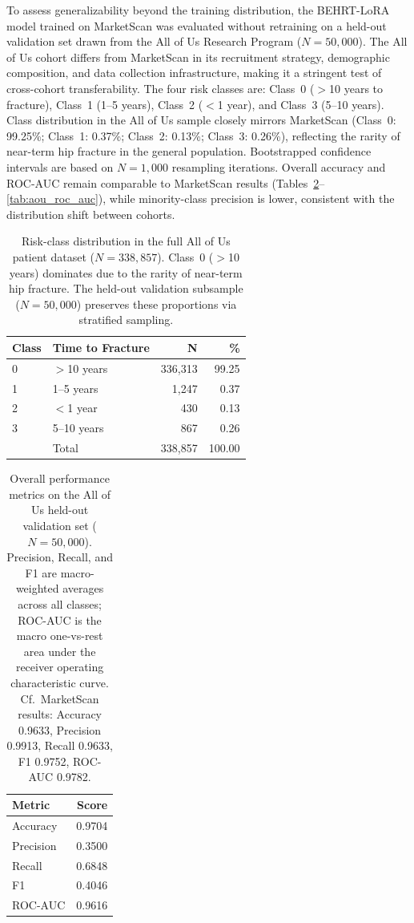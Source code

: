 \documentclass{article}
\begin{document}
To assess generalizability beyond the training distribution, the BEHRT-LoRA model trained on MarketScan was evaluated without retraining on a held-out validation set drawn from the All of Us Research Program ($N = 50{,}000$). The All of Us cohort differs from MarketScan in its recruitment strategy, demographic composition, and data collection infrastructure, making it a stringent test of cross-cohort transferability. The four risk classes are: Class~0 ($>$10 years to fracture), Class~1 (1--5 years), Class~2 ($<$1 year), and Class~3 (5--10 years). Class distribution in the All of Us sample closely mirrors MarketScan (Class~0: 99.25\%; Class~1: 0.37\%; Class~2: 0.13\%; Class~3: 0.26\%), reflecting the rarity of near-term hip fracture in the general population. Bootstrapped confidence intervals are based on $N=1{,}000$ resampling iterations. Overall accuracy and ROC-AUC remain comparable to MarketScan results (Tables~\ref{tab:aou_overall}--\ref{tab:aou_roc_auc}), while minority-class precision is lower, consistent with the distribution shift between cohorts.

\begin{table}[h]
\caption{Risk-class distribution in the full All of Us patient dataset ($N=338{,}857$). Class~0 ($>$10 years) dominates due to the rarity of near-term hip fracture. The held-out validation subsample ($N=50{,}000$) preserves these proportions via stratified sampling.}
\label{tab:aou_class_distribution}
\begin{tabular}{llrr}
\toprule
Class & Time to Fracture & N & \% \\
\midrule
0 & $>$10 years & 336{,}313 & 99.25 \\
1 & 1--5 years  &   1{,}247 &  0.37 \\
2 & $<$1 year   &     430   &  0.13 \\
3 & 5--10 years &     867   &  0.26 \\
\midrule
  & Total       & 338{,}857 & 100.00 \\
\bottomrule
\end{tabular}
\end{table}

\begin{table}[h]
\caption{Overall performance metrics on the All of Us held-out validation set ($N=50{,}000$). Precision, Recall, and F1 are macro-weighted averages across all classes; ROC-AUC is the macro one-vs-rest area under the receiver operating characteristic curve. Cf.\ MarketScan results: Accuracy 0.9633, Precision 0.9913, Recall 0.9633, F1 0.9752, ROC-AUC 0.9782.}
\label{tab:aou_overall}
\begin{tabular}{lr}
\toprule
Metric & Score \\
\midrule
Accuracy  & 0.9704 \\
Precision & 0.3500 \\
Recall    & 0.6848 \\
F1        & 0.4046 \\
ROC-AUC   & 0.9616 \\
\bottomrule
\end{tabular}
\end{table}
\end{document}

